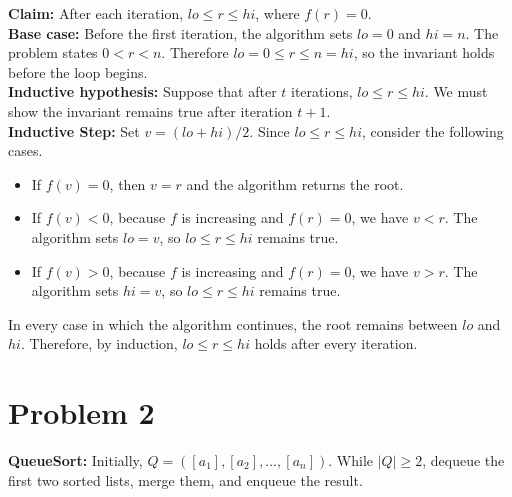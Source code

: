 \documentclass[11pt]{article}
\begin{document}
\textbf{Claim:} After each iteration, $lo\le r\le hi$, where $f(r)=0$. \\

\textbf{Base case:} Before the first iteration, the algorithm sets $lo=0$ and $hi=n$. The problem states $0<r<n$. Therefore $lo=0\le r\le n=hi$, so the invariant holds before the loop begins.\\

\textbf{Inductive hypothesis:} Suppose that after $t$ iterations, $lo\le r\le hi$. We must show the invariant remains true after iteration $t+1$.\\

\textbf{Inductive Step:} Set $v=(lo+hi)/2$. Since $lo\le r\le hi$, consider the following cases.

\begin{itemize}

\item If $f(v)=0$, then $v=r$ and the algorithm returns the root. 

\item If $f(v)<0$, because $f$ is increasing and $f(r)=0$, we have $v<r$. The algorithm sets $lo=v$, so $lo\le r\le hi$ remains true.

\item If $f(v)>0$, because $f$ is increasing and $f(r)=0$, we have $v>r$. The algorithm sets $hi=v$, so $lo\le r\le hi$ remains true.

\end{itemize}

In every case in which the algorithm continues, the root remains between $lo$ and $hi$. Therefore, by induction, $lo\le r\le hi$ holds after every iteration.

\section*{Problem 2}

\noindent\textbf{QueueSort:} Initially, $Q=([a_1],[a_2],\ldots,[a_n])$. While $|Q|\geq 2$, dequeue the first two sorted lists, merge them, and enqueue the result.
\end{document}

